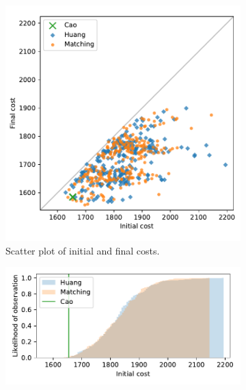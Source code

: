 \documentclass[11pt]{article}
\begin{document}
\begin{figure}
    \begin{subfigure}{.5\textwidth}
        \includegraphics[width=\linewidth]{Fig4a.pdf}
        \caption{Scatter plot of initial and final costs.}
    \end{subfigure}
    \hfill%
    \begin{subfigure}{.5\textwidth}
        \includegraphics[width=\linewidth]{Fig4b1.pdf}


\end{subfigure}
\end{figure}
\end{document}

